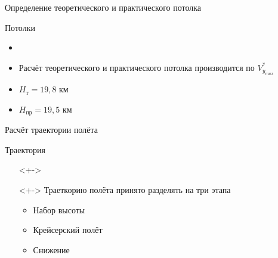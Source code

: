 \begin{frame}{Определение теоретического и практического потолка}
    \begin{minipage}[c]{0.45\textwidth}
        \begin{block}{Потолки}
        \begin{itemize}
            \item <+-> []
            \item <+-> [] Расчёт теоретического и практического потолка производится по $V^*_{y_{max}}$
            \item <+-> [] $H_\text{т} = 19,8$ км 
            \item <+-> [] $H_\text{пр} = 19,5$ км
        \end{itemize}
        \end{block}
    \end{minipage}
    \begin{minipage}[c]{0.45\textwidth}
    \end{minipage}
\end{frame}

\begin{frame}{Расчёт траектории полёта}
    \begin{block}{Траектория}
    \begin{itemize}
        \item [] <+->
        \item [] <+-> Траеткорию полёта принято разделять на три этапа 
            \begin{itemize}
                \item Набор высоты 
                \item Крейсерский полёт 
                \item Снижение 
            \end{itemize}
    \end{itemize}
    \end{block}
\end{frame}

